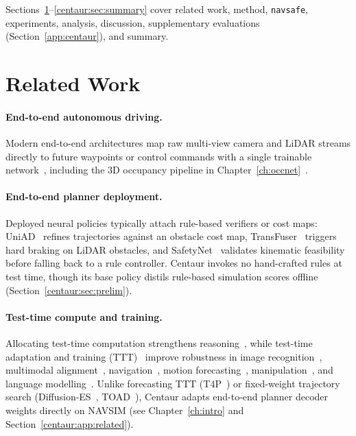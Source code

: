 Sections~\ref{centaur:sec:related}--\ref{centaur:sec:summary} cover related work, method, \texttt{navsafe}, experiments, analysis, discussion, supplementary evaluations (Section~\ref{app:centaur}), and summary.

\section{Related Work}\label{centaur:sec:related}

\paragraph{End-to-end autonomous driving.} Modern end-to-end architectures map raw multi-view camera and LiDAR streams directly to future waypoints or control commands with a single trainable network~\cite{chen2024e2esurvey,Prakash2021transfuser,chitta2021neat,jaeger2023hidden,zimmerlin2024tf,chen2024vadv2,jiang2023vad,hu2023uniad,hu2022model,jia2023think,wang2023drivedreamer,jia2023driveadapter,li2024hydramdp,liao2025diffusiondrive}, including the 3D occupancy pipeline in Chapter~\ref{ch:occnet}~\cite{sima2023occnet}.

\paragraph{End-to-end planner deployment.} Deployed neural policies typically attach rule-based verifiers or cost maps: UniAD~\cite{hu2023uniad} refines trajectories against an obstacle cost map, TransFuser~\cite{chitta2023transfuser} triggers hard braking on LiDAR obstacles, and SafetyNet~\cite{vitelli2022safetynet} validates kinematic feasibility before falling back to a rule controller. Centaur invokes no hand-crafted rules at test time, though its base policy distils rule-based simulation scores offline (Section~\ref{centaur:sec:prelim}).

\paragraph{Test-time compute and training.} Allocating test-time computation strengthens reasoning~\cite{openaio1}, while test-time adaptation and training (TTT)~\cite{liang2025ttasurvey} improve robustness in image recognition~\cite{sun2020ttt,wang2021tent,hakim2023clust3,marsden2024universal}, multimodal alignment~\cite{shu2022test,yoon2024c}, navigation~\cite{Gao2024fstta}, motion forecasting~\cite{park2024t4p}, manipulation~\cite{hansen2021pad}, and language modelling~\cite{sun2024learning}. Unlike forecasting TTT (T4P~\cite{park2024t4p}) or fixed-weight trajectory search (Diffusion-ES~\cite{yang2024diffusiones}, TOAD~\cite{xu2026toad}), Centaur adapts end-to-end planner decoder weights directly on NAVSIM (see Chapter~\ref{ch:intro} and Section~\ref{centaur:app:related}).

